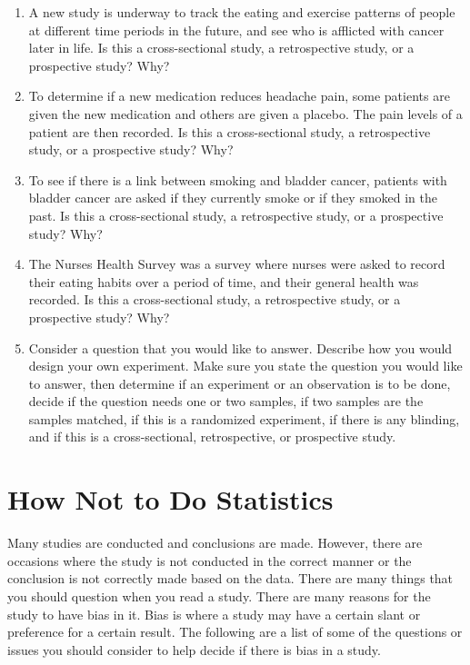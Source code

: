 \documentclass[]{book}
\begin{document}
\begin{enumerate}
\item
  A new study is underway to track the eating and exercise patterns of people at different time periods in the future, and see who is afflicted with cancer later in life. Is this a cross-sectional study, a retrospective study, or a prospective study? Why?
\item
  To determine if a new medication reduces headache pain, some patients are given the new medication and others are given a placebo. The pain levels of a patient are then recorded. Is this a cross-sectional study, a retrospective study, or a prospective study? Why?
\item
  To see if there is a link between smoking and bladder cancer, patients with bladder cancer are asked if they currently smoke or if they smoked in the past. Is this a cross-sectional study, a retrospective study, or a prospective study? Why?
\item
  The Nurses Health Survey was a survey where nurses were asked to record their eating habits over a period of time, and their general health was recorded. Is this a cross-sectional study, a retrospective study, or a prospective study? Why?
\item
  Consider a question that you would like to answer. Describe how you would design your own experiment. Make sure you state the question you would like to answer, then determine if an experiment or an observation is to be done, decide if the question needs one or two samples, if two samples are the samples matched, if this is a randomized experiment, if there is any blinding, and if this is a cross-sectional, retrospective, or prospective study.
\end{enumerate}

\hypertarget{how-not-to-do-statistics}{%
\section{How Not to Do Statistics}\label{how-not-to-do-statistics}}

Many studies are conducted and conclusions are made. However, there are
occasions where the study is not conducted in the correct manner or the
conclusion is not correctly made based on the data. There are many
things that you should question when you read a study. There are many
reasons for the study to have bias in it. Bias is where a study may have
a certain slant or preference for a certain result. The following are a
list of some of the questions or issues you should consider to help
decide if there is bias in a study.
\end{document}
